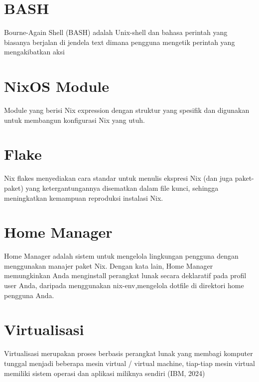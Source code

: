 \documentclass[10pt,twoside]{report}
\begin{document}
\section{BASH}
\begin{adjustwidth}{20pt}{}
	\vspace{-3mm}
	Bourne-Again Shell (BASH) adalah Unix-shell dan bahasa perintah yang biasanya
	berjalan di jendela text dimana pengguna mengetik perintah yang mengakibatkan
	aksi
\end{adjustwidth}
\section{NixOS Module}
\begin{adjustwidth}{20pt}{}
	\vspace{-3mm}
	Module yang berisi Nix expression dengan struktur yang spesifik dan digunakan
	untuk membangun konfigurasi Nix yang utuh.
\end{adjustwidth}
\section{Flake}
\begin{adjustwidth}{20pt}{}
	\vspace{-3mm} Nix flakes menyediakan cara standar untuk menulis ekspresi Nix (dan juga paket-paket) yang ketergantungannya disematkan dalam file kunci, sehingga meningkatkan kemampuan reproduksi instalasi Nix.
\end{adjustwidth}
\section{Home Manager}
\begin{adjustwidth}{20pt}{}
	\vspace{-3mm}
	Home Manager adalah sistem untuk mengelola lingkungan pengguna dengan
	menggunakan manajer paket Nix. Dengan kata lain, Home Manager memungkinkan
	Anda menginstall perangkat lunak secara deklaratif pada profil user Anda,
	daripada menggunakan nix-env,mengelola dotfile di direktori home pengguna
	Anda.
\end{adjustwidth}
\section{Virtualisasi}
\begin{adjustwidth}{20pt}{}
	\vspace{-3mm}
	Virtualisasi merupakan proses berbasis perangkat lunak yang membagi komputer
	tunggal menjadi beberapa mesin virtual / virtual machine, tiap-tiap mesin
	virtual memiliki sistem operasi dan aplikasi miliknya sendiri (IBM, 2024)
\end{adjustwidth}
\end{document}
